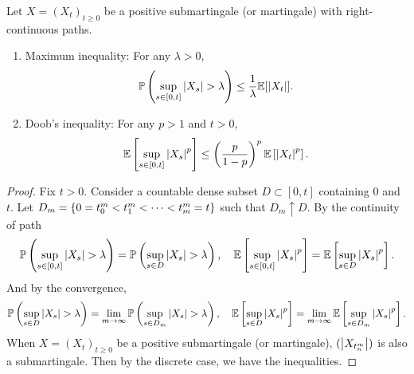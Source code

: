 \begin{thm}
    Let $X=(X_t)_{t \geq 0}$ be a positive submartingale (or martingale) with right-continuous paths.
    \begin{enumerate}[label=(\arabic{*})]
        \item Maximum inequality: For any $\lambda > 0$,
        \begin{equation*}
            \mathbb{P}\left(\sup_{s \in [0,t]} \left\lvert X_s\right\lvert > \lambda\right) \leq \frac{1}{\lambda} \mathbb{E}[\left\lvert X_t\right\lvert].
        \end{equation*}

        \item Doob's inequality: For any $p > 1$ and $t > 0$,
        \begin{equation*}
            \mathbb{E}\left[\sup_{s \in [0,t]} \left\lvert X_s\right\lvert^p\right] \leq \left(\frac{p}{1 - p}\right)^p \mathbb{E}\left[\left\lvert X_t\right\lvert^p\right].
        \end{equation*}
    \end{enumerate}
\end{thm}
\begin{proof}
    Fix $t > 0$. Consider a countable dense subset $D \subset [0,t]$ containing $0$ and $t$. Let $D_m = \left\{0 = t_0^m < t_1^m < \cdots < t^m_m = t\right\}$ such that $D_m \uparrow D$. By the continuity of path
    \begin{equation*}
        \mathbb{P}\left(\sup_{s \in [0,t]} \left\lvert X_s\right\lvert > \lambda\right) = \mathbb{P}\left(\sup_{s \in D} \left\lvert X_s\right\lvert > \lambda\right),\quad \mathbb{E}\left[\sup_{s \in [0,t]} \left\lvert X_s\right\lvert^p\right] = \mathbb{E}\left[\sup_{s \in D} \left\lvert X_s\right\lvert^p\right].
    \end{equation*}
    And by the convergence,
    \begin{equation*}
        \mathbb{P}\left(\sup_{s \in D} \left\lvert X_s\right\lvert > \lambda\right) = \lim_{m \rightarrow \infty } \mathbb{P}\left(\sup_{s \in D_m} \left\lvert X_s\right\lvert > \lambda\right),\quad  \mathbb{E}\left[\sup_{s \in D} \left\lvert X_s\right\lvert^p\right] = \lim_{m \rightarrow \infty } \mathbb{E}\left[\sup_{s \in D_m} \left\lvert X_s\right\lvert^p\right].
    \end{equation*}
    When $X=(X_t)_{t \geq 0}$ be a positive submartingale (or martingale), $(\left\lvert X_{t_n^m}\right\lvert)$ is also a submartingale. Then by the discrete case, we have the inequalities.
\end{proof}
